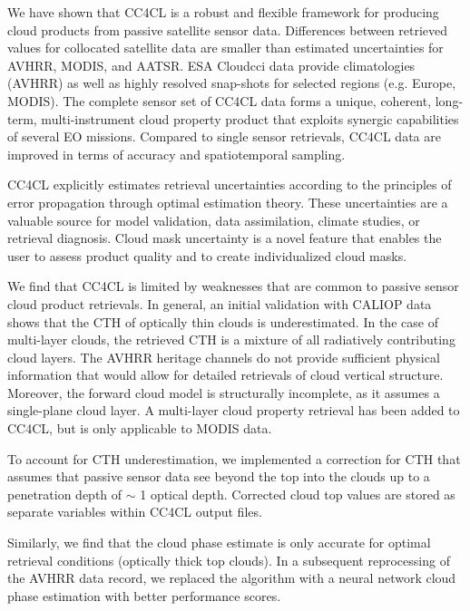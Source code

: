 \conclusions\label{conclusions}

We have shown that CC4CL is a robust and flexible framework for producing cloud products from passive satellite sensor data. Differences between retrieved values for collocated satellite data are smaller than estimated uncertainties for AVHRR, MODIS, and AATSR. ESA Cloud\textunderscore cci data provide climatologies (AVHRR) as well as highly resolved snap-shots for selected regions (e.g. Europe, MODIS). The complete sensor set of CC4CL data forms a unique, coherent, long-term, multi-instrument cloud property product that exploits synergic capabilities of several EO missions. Compared to single sensor retrievals, CC4CL data are improved in terms of accuracy and spatiotemporal sampling.

CC4CL explicitly estimates retrieval uncertainties according to the principles of error propagation through optimal estimation theory. These uncertainties are a valuable source for model validation, data assimilation, climate studies, or retrieval diagnosis. Cloud mask uncertainty is a novel feature that enables the user to assess product quality and to create individualized cloud masks.  %

We find that CC4CL is limited by weaknesses that are common to passive sensor cloud product retrievals. In general, an initial validation with CALIOP data shows that the CTH of optically thin clouds is underestimated. In the case of multi-layer clouds, the retrieved CTH is a mixture of all radiatively contributing cloud layers. The AVHRR heritage channels do not provide sufficient physical information that would allow for detailed retrievals of cloud vertical structure. Moreover, the forward cloud model is structurally incomplete, as it assumes a single-plane cloud layer. A multi-layer cloud property retrieval has been added to CC4CL, but is only applicable to MODIS data. 

To account for CTH underestimation, we implemented a correction for CTH that assumes that passive sensor data see beyond the top into the clouds up to a penetration depth of $\sim$ 1 optical depth. Corrected cloud top values are stored as separate variables within CC4CL output files. 

Similarly, we find that the cloud phase estimate is only accurate for optimal retrieval conditions (optically thick top clouds). In a subsequent reprocessing of the AVHRR data record, we replaced the \citet{Pavolonis05} algorithm with a neural network cloud phase estimation with better performance scores. 

